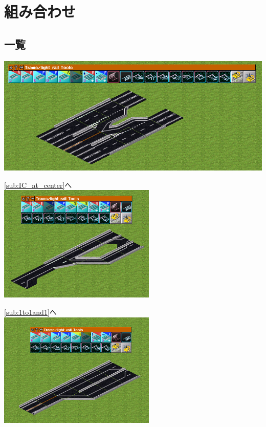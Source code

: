 \documentclass{jbook}
\begin{document}
\newpage

\section{組み合わせ}
\subsection*{一覧}


  \includegraphics[width = 135mm]{picture/20210214-road-1-9.png}

  \ref{sub:IC_at_center}へ\\

  \includegraphics[width = 75mm]{picture/20210214-road-2-8.png}

  \ref{sub:1to1and1}へ\\

  \includegraphics[width = 75mm]{picture/20210214-road-3-6.png}
\end{document}
